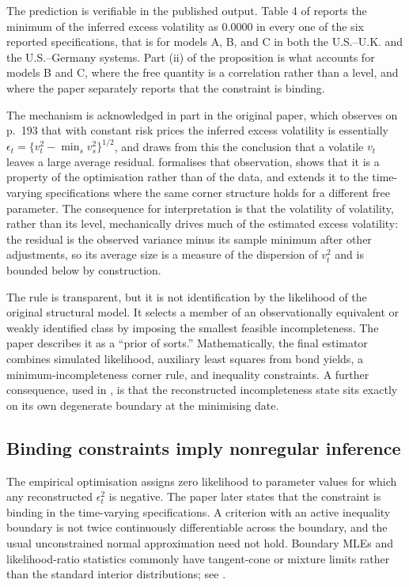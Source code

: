 \documentclass[11pt]{article}
\theoremstyle{definition}
\begin{document}
The prediction is verifiable in the published output. Table 4 of \citet{BrandtSantaClara2002} reports the minimum of the inferred excess volatility as $0.0000$ in every one of the six reported specifications, that is for models A, B, and C in both the U.S.--U.K. and the U.S.--Germany systems. Part (ii) of the proposition is what accounts for models B and C, where the free quantity is a correlation rather than a level, and where the paper separately reports that the constraint is binding.

The mechanism is acknowledged in part in the original paper, which observes on p.~193 that with constant risk prices the inferred excess volatility is essentially $\epsilon_t=\{v_t^2-\min_s v_s^2\}^{1/2}$, and draws from this the conclusion that a volatile $v_t$ leaves a large average residual.  formalises that observation, shows that it is a property of the optimisation rather than of the data, and extends it to the time-varying specifications where the same corner structure holds for a different free parameter. The consequence for interpretation is that the volatility of volatility, rather than its level, mechanically drives much of the estimated excess volatility: the residual is the observed variance minus its sample minimum after other adjustments, so its average size is a measure of the dispersion of $v_t^2$ and is bounded below by construction.

The rule is transparent, but it is not identification by the likelihood of the original structural model. It selects a member of an observationally equivalent or weakly identified class by imposing the smallest feasible incompleteness. The paper describes it as a ``prior of sorts.'' Mathematically, the final estimator combines simulated likelihood, auxiliary least squares from bond yields, a minimum-incompleteness corner rule, and inequality constraints. A further consequence, used in , is that the reconstructed incompleteness state sits exactly on its own degenerate boundary at the minimising date.

\subsection{Binding constraints imply nonregular inference}

The empirical optimisation assigns zero likelihood to parameter values for which any reconstructed $\epsilon_t^2$ is negative. The paper later states that the constraint is binding in the time-varying specifications. A criterion with an active inequality boundary is not twice continuously differentiable across the boundary, and the usual unconstrained normal approximation need not hold. Boundary MLEs and likelihood-ratio statistics commonly have tangent-cone or mixture limits rather than the standard interior distributions; see \citet{SelfLiang1987}.
\end{document}
